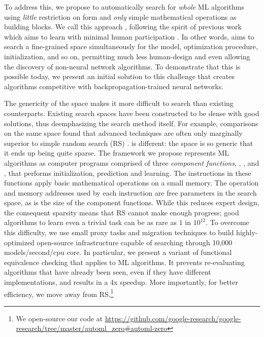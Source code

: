 To address this, we propose to automatically search for \textit{whole} ML algorithms using \textit{little} restriction on form and \textit{only} simple mathematical operations as building blocks. We call this approach \textit{\amlz}, following the spirit of previous work which aims to learn with minimal human participation . In other words, \amlz aims to search a fine-grained space simultaneously for the model, optimization procedure, initialization, and so on, permitting much less human-design and even allowing the discovery of \mbox{non-neural} network algorithms. To demonstrate that this is possible today, we present an initial solution to this challenge that creates algorithms competitive with backpropagation-trained neural networks.

The genericity of the \amlz space makes it more difficult to search than existing \aml counterparts. Existing \aml search spaces have been constructed to be dense with good solutions, thus deemphasizing the search method itself. For example, comparisons on the same space found that advanced techniques are often only marginally superior to simple random search (RS) \cite{li2019RS,elsken2019neural,negrinho2019towards}. \amlz is different: the space is so generic that it ends up being quite sparse. The framework we propose represents ML algorithms as computer programs comprised of three \emph{component functions}, \setup, \predict, and \learn, that performs initialization, prediction and learning. The instructions in these functions apply basic mathematical operations on a small memory. The operation and memory addresses used by each instruction are free parameters in the search space, as is the size of the component functions. While this reduces expert design, the consequent sparsity means that RS cannot make enough progress; \eg good algorithms to learn even a trivial task can be as rare as $1$ in $10^{12}$. To overcome this difficulty, we use small proxy tasks and migration techniques to build highly-optimized open-source infrastructure capable of searching through 10,000 models/second/cpu core. In particular, we present a variant of functional equivalence checking that applies to ML algorithms. It prevents re-evaluating algorithms that have already been seen, even if they have different implementations, and results in a 4x speedup. More importantly, for better efficiency, we move away from RS.\footnote{\label{open_source_fn}We open-source our code at \url{https://github.com/google-research/google-research/tree/master/automl_zero\#automl-zero}}

